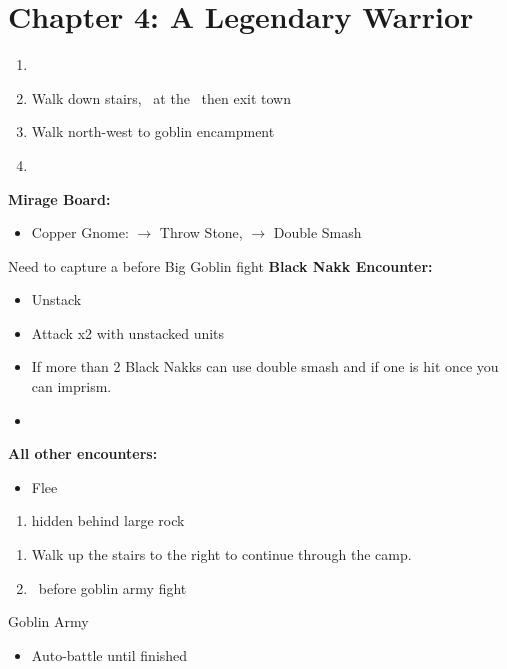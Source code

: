 \chapter{Chapter 4: A Legendary Warrior}
\begin{enumerate}
	\item \cs\
	\item Walk down stairs, \cs\ at the \gate\ then exit town
	\item Walk north-west to goblin encampment
	\item \cs\
\end{enumerate}
\begin{menu}
	\textbf{Mirage Board:}
	\begin{itemize}
		\item Copper Gnome: $\rightarrow$ Throw Stone, $\rightarrow$ Double Smash
	\end{itemize}
\end{menu}
\begin{encounters}
Need to capture a  before Big Goblin fight
\newline
\vspace{\baselineskip}
\textbf{Black Nakk Encounter:}
	\begin{itemize}
		\item Unstack
		\item Attack x2 with unstacked units
		\item If more than 2 Black Nakks can use double smash and if one is hit once you can imprism.
		\item \imprism\
	\end{itemize}
\textbf{All other encounters:}
	\begin{itemize}
		\item Flee
	\end{itemize}
\end{encounters}
\begin{enumerate}[resume]
	\item {} hidden behind large rock
\end{enumerate}
\image{Chapter4_Ether}
\begin{enumerate}[resume]
	\item Walk up the stairs to the right to continue through the camp.
	\item \cs\ before goblin army fight
\end{enumerate}
\begin{battle}[]{Goblin Army}
	\begin{itemize}
		\reynnf\ Attack
		\lannf\ Double Smash
		\item Auto-battle until finished
	\end{itemize}
\end{battle}
